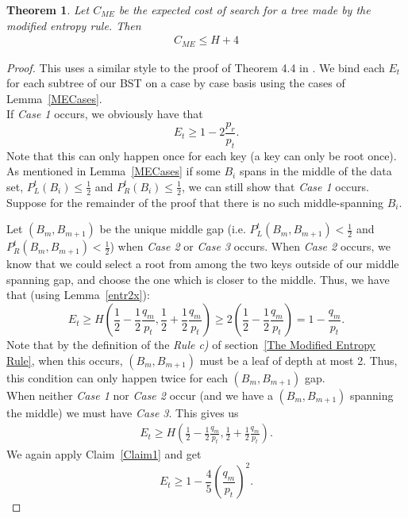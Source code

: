 \documentclass[letterpaper,12pt,titlepage,oneside,final]{book}
\theoremstyle{plain}
\newtheorem{thm}{Theorem}[section]
\begin{document}
\begin{thm}
Let $C_{ME}$ be the expected cost of search for a tree made by the modified entropy rule. Then
\begin{align*}
C_{ME} \leq H + 4
\end{align*}
\end{thm}

\begin{proof}
This uses a similar style to the proof of Theorem 4.4 in \cite{bayer1975improved}.
We bind each $E_t$ for each subtree of our BST on a case by case basis using the cases of Lemma~\ref{MECases}.\\
If \textit{Case 1} occurs, we obviously have that
\begin{equation}\label{EQC1}
E_t \geq 1-2 \frac{p_r}{p_t}.
\end{equation}
Note that this can only happen once for each key (a key can only be root once). \\

As mentioned in Lemma~\ref{MECases} if some $B_i$ spans in the middle of the data set, $P^t_L(B_i) \leq \frac{1}{2}$ and $P^t_R(B_i) \leq \frac{1}{2}$, we can still show that \textit{Case 1} occurs. Suppose for the remainder of the proof that there is no such middle-spanning $B_i$.

Let $(B_m, B_{m+1})$ be the unique middle gap (i.e. $P^t_L(B_m, B_{m+1}) < \frac{1}{2}$ and $P^t_R(B_m, B_{m+1}) < \frac{1}{2}$) when \textit{Case 2} or \textit{Case 3} occurs. When \textit{Case 2} occurs, we know that we could select a root from among the two keys outside of our middle spanning gap, and choose the one which is closer to the middle. Thus, we have that (using Lemma~\ref{entr2x}):
\begin{equation}\label{EQC2} 
E_t \geq H(\frac{1}{2}-\frac{1}{2} \frac{q_m}{p_t}, \frac{1}{2} + \frac{1}{2} \frac{q_m}{p_t}) \geq 2(\frac{1}{2}-\frac{1}{2} \frac{q_m}{p_t})=1-\frac{q_m}{p_t}.
\end{equation}
Note that by the definition of the \textit{Rule c)} of section~\ref{The Modified Entropy Rule}, when this occurs, $(B_m, B_{m+1})$ must be a leaf of depth at most 2. Thus, this condition can only happen twice for each $(B_m, B_{m+1})$ gap. \\

When neither \textit{Case 1} nor \textit{Case 2} occur (and we have a $(B_m, B_{m+1})$ spanning the middle) we must have \textit{Case 3}. This gives us
\begin{align*}
E_t \geq H(\frac{1}{2}-\frac{1}{2} \frac{q_m}{p_t}, \frac{1}{2} + \frac{1}{2} \frac{q_m}{p_t}).
\end{align*}
We again apply Claim~\ref{Claim1} and get
\begin{equation}\label{EQC3}
E_t \geq 1- \frac{4}{5} (\frac{q_m}{p_t})^2.
\end{equation}


\end{proof}
\end{document}
